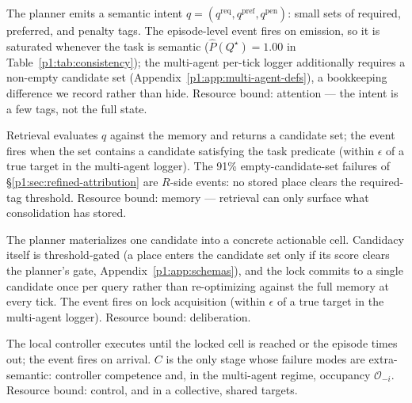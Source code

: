 \documentclass{article}
\begin{document}
\begin{description}[leftmargin=10pt,topsep=2pt,itemsep=2pt]
\item[$Q^\star$ (intent issued).] The planner emits a semantic intent $q=(q^{\mathrm{req}},q^{\mathrm{pref}},q^{\mathrm{pen}})$: small sets of required, preferred, and penalty tags. The episode-level event fires on emission, so it is saturated whenever the task is semantic ($\hat P(Q^\star){=}1.00$ in Table~\ref{p1:tab:consistency}); the multi-agent per-tick logger additionally requires a non-empty candidate set (Appendix~\ref{p1:app:multi-agent-defs}), a bookkeeping difference we record rather than hide. Resource bound: attention --- the intent is a few tags, not the full state.
\item[$R^\star$ (memory answers).] Retrieval evaluates $q$ against the memory and returns a candidate set; the event fires when the set contains a candidate satisfying the task predicate (within $\epsilon$ of a true target in the multi-agent logger). The 91\% empty-candidate-set failures of \S\ref{p1:sec:refined-attribution} are $R$-side events: no stored place clears the required-tag threshold. Resource bound: memory --- retrieval can only surface what consolidation has stored.
\item[$M^\star$ (target lock).] The planner materializes one candidate into a concrete actionable cell. Candidacy itself is threshold-gated (a place enters the candidate set only if its score clears the planner's gate, Appendix~\ref{p1:app:schemas}), and the lock commits to a single candidate once per query rather than re-optimizing against the full memory at every tick. The event fires on lock acquisition (within $\epsilon$ of a true target in the multi-agent logger). Resource bound: deliberation.
\item[$C^\star$ (closed-loop completion).] The local controller executes until the locked cell is reached or the episode times out; the event fires on arrival. $C$ is the only stage whose failure modes are extra-semantic: controller competence and, in the multi-agent regime, occupancy $\mathcal{O}_{-i}$. Resource bound: control, and in a collective, shared targets.
\end{description}
\end{document}
